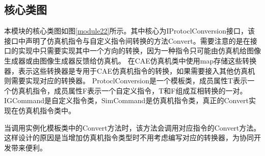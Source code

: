 \subsection{核心类图}
\par
本模块的核心类图如图\ref{module22}所示。其中核心为IProtoclConversion接口，该接口中声明了仿真机指令与自定义指令间转换的方法Convert。需要注意的是在接口的实现中只需要实现其中一个方向的转换，因为一种指令只可能由仿真机给图像生成器或由图像生成器反馈给仿真机。
在CAE仿真机类中使用map存储这些转换器，表示这些转换器是专用于CAE仿真机指令的转换，如果需要接入其他仿真机则需要实现对应的转换器。
ProtoclConversion是一个模板类，成员属性T表示一个仿真机指令，成员属性F表示一个自定义指令，T和F组成互相转换的一对。
IGCommand是自定义指令类，SimCommand是仿真机指令类，真正的Convert实现在仿真机指令类中。
\par
当调用实例化模板类中的Convert方法时，该方法会调用对应指令的Convert方法。
这样设计的原因是当增加仿真机指令类型时不用考虑编写对应的转换器，为协同开发带来便利。


